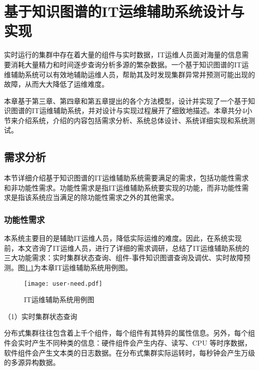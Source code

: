 \chapter{基于知识图谱的IT运维辅助系统设计与实现}
实时运行的集群中存在着大量的组件与实时数据，IT运维人员面对海量的信息需要消耗大量精力和时间逐步查询分析多源的繁杂数据。一个基于知识图谱的IT运维辅助系统可以有效地辅助运维人员，帮助其及时发现集群异常并预测可能出现的故障，从而大大降低了运维难度。

本章基于第三章、第四章和第五章提出的各个方法模型，设计并实现了一个基于知识图谱的IT运维辅助系统，并对设计与实现过程展开了细致地描述。本章共分4小节来介绍系统，介绍的内容包括需求分析、系统总体设计、系统详细实现和系统测试。


\section{需求分析}\label{need-analysis}
本节详细介绍基于知识图谱的IT运维辅助系统需要满足的需求，包括功能性需求和非功能性需求。功能性需求是指IT运维辅助系统要实现的功能，而非功能性需求是指该系统应当满足的除功能性需求之外的其他需求。
\subsection{功能性需求}
本系统主要目的是辅助IT运维人员，降低实际运维的难度。因此，在系统实现前，本文咨询了IT运维人员，进行了详细的需求调研，总结了IT运维辅助系统的三大功能需求：实时集群状态查询、组件-事件知识图谱查询及调优、实时故障预测。图\ref{user-need}为本章IT运维辅助系统用例图。
\begin{figure}[htbp]
    \centering
    \texttt{[image: user-need.pdf]}
    \caption{IT运维辅助系统用例图\label{user-need}}
\end{figure}

（1）实时集群状态查询

分布式集群往往包含着上千个组件，每个组件有其特异的属性信息。另外，每个组件会实时产生不同种类的信息：硬件组件会产生内存、读写、CPU 等时序数据，软件组件会产生文本类的日志数据。在分布式集群实际运转时，每秒钟会产生万级的多源异构数据。

